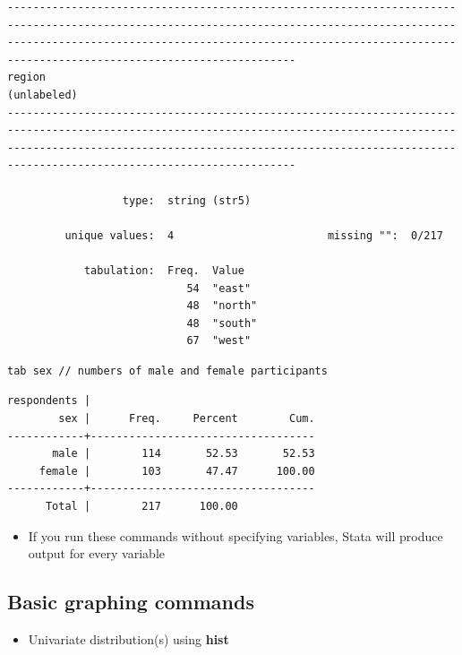 \documentclass[]{book}
\providecommand{\tightlist}{%
  \setlength{\itemsep}{0pt}\setlength{\parskip}{0pt}}
\begin{document}
\begin{verbatim}
---------------------------------------------------------------------------------------------------------------------------------------------------------------------------------------------------------------------------------------------------------------
region                                                                                                                                                                                                                                              (unlabeled)
---------------------------------------------------------------------------------------------------------------------------------------------------------------------------------------------------------------------------------------------------------------

                  type:  string (str5)

         unique values:  4                        missing "":  0/217

            tabulation:  Freq.  Value
                            54  "east"
                            48  "north"
                            48  "south"
                            67  "west"
\end{verbatim}

\begin{verbatim}
tab sex // numbers of male and female participants
\end{verbatim}

\begin{verbatim}
respondents |
        sex |      Freq.     Percent        Cum.
------------+-----------------------------------
       male |        114       52.53       52.53
     female |        103       47.47      100.00
------------+-----------------------------------
      Total |        217      100.00
\end{verbatim}

\begin{itemize}
\tightlist
\item
  If you run these commands without specifying variables, Stata will
  produce output for every variable
\end{itemize}

\subsection{Basic graphing commands}\label{basic-graphing-commands}

\begin{itemize}
\tightlist
\item
  Univariate distribution(s) using \textbf{hist}
\end{itemize}
\end{document}
